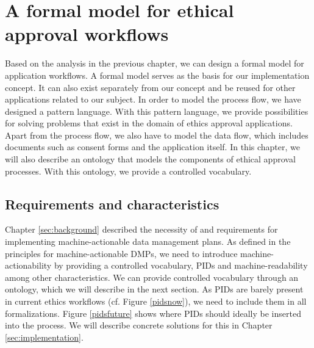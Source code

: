 \documentclass[10pt]{article}
\begin{document}
\newpage

\section{A formal model for ethical approval workflows}
\label{sec:formalmodel}
Based on the analysis in the previous chapter, we can design a formal model for application workflows. A formal model serves as the basis for our implementation concept. It can also exist separately from our concept and be reused for other applications related to our subject.   
In order to model the process flow, we have designed a pattern language. With this pattern language, we provide possibilities for solving problems that exist in the domain of ethics approval applications. Apart from the process flow, we also have to model the data flow, which includes documents such as consent forms and the application itself. In this chapter, we will also describe an ontology that models the components of ethical approval processes. With this ontology, we provide a controlled vocabulary.

\subsection{Requirements and characteristics}
Chapter \ref{sec:background} described the necessity of and requirements for implementing machine-actionable data management plans. As defined in the principles for machine-actionable DMPs, we need to introduce machine-actionability by providing a controlled vocabulary, PIDs and machine-readability among other characteristics.
We can provide controlled vocabulary through an ontology, which we will describe in the next section. As PIDs are barely present in current ethics workflows (cf. Figure \ref{pidsnow}), we need to include them in all formalizations. Figure \ref{pidsfuture} shows where PIDs should ideally be inserted into the process. We will describe concrete solutions for this in Chapter \ref{sec:implementation}.
\end{document}
